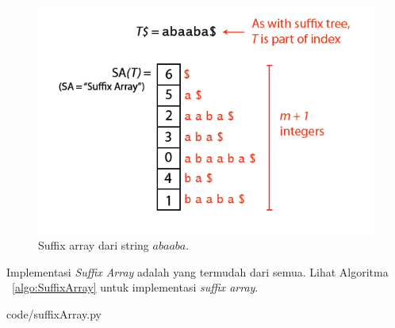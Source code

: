 	\begin{figure}
		\includegraphics[width=\textwidth,keepaspectratio]{fig/suffixarray.png}%
		\caption{Suffix array dari string $abaaba$.}%
		\label{fig:suffixarray}%
	\end{figure}
	
Implementasi \textit{Suffix Array} adalah yang termudah dari semua. Lihat Algoritma ~\ref{algo:SuffixArray} untuk implementasi \textit{suffix array}.


                {code/suffixArray.py}